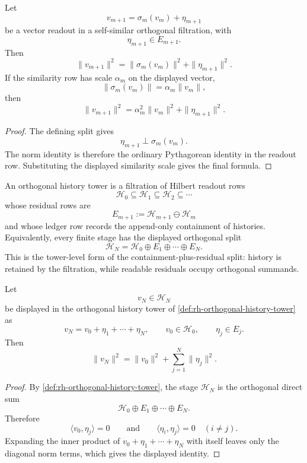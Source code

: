 \begin{theorem}
\label{thm:rh-pythagorean-innovation-law}
Let
$$
v_{m+1}
=
\sigma_m(v_m)+\eta_{m+1}
$$
be a vector readout in a self-similar orthogonal filtration, with
$$
\eta_{m+1}\in E_{m+1}.
$$
Then
$$
\|v_{m+1}\|^2
=
\|\sigma_m(v_m)\|^2+\|\eta_{m+1}\|^2.
$$
If the similarity row has scale $\alpha_m$ on the displayed vector,
$$
\|\sigma_m(v_m)\|=\alpha_m\|v_m\|,
$$
then
$$
\|v_{m+1}\|^2
=
\alpha_m^2\|v_m\|^2+\|\eta_{m+1}\|^2.
$$
\end{theorem}

\begin{proof}
The defining split gives
$$
\eta_{m+1}\perp\sigma_m(v_m).
$$
The norm identity is therefore the ordinary Pythagorean identity in the
readout row. Substituting the displayed similarity scale gives the final
formula.
\end{proof}

\begin{definition}
\label{def:rh-orthogonal-history-tower}
An orthogonal history tower is a filtration of Hilbert readout rows
$$
\mathcal H_0\subseteq\mathcal H_1\subseteq
\mathcal H_2\subseteq\cdots
$$
whose residual rows are
$$
E_{m+1}
:=
\mathcal H_{m+1}\ominus\mathcal H_m
$$
and whose ledger row records the append-only containment of histories.
Equivalently, every finite stage has the displayed orthogonal split
$$
\mathcal H_N
=
\mathcal H_0\oplus E_1\oplus\cdots\oplus E_N.
$$
This is the tower-level form of the containment-plus-residual split:
history is retained by the filtration, while readable residuals occupy
orthogonal summands.
\end{definition}

\begin{theorem}
\label{thm:rh-orthogonal-history-tower-pythagorean-formula}
Let
$$
v_N\in\mathcal H_N
$$
be displayed in the orthogonal history tower of
\autoref{def:rh-orthogonal-history-tower} as
$$
v_N
=
v_0+\eta_1+\cdots+\eta_N,
\qquad
v_0\in\mathcal H_0,
\qquad
\eta_j\in E_j.
$$
Then
$$
\|v_N\|^2
=
\|v_0\|^2+\sum_{j=1}^{N}\|\eta_j\|^2.
$$
\end{theorem}

\begin{proof}
By \autoref{def:rh-orthogonal-history-tower}, the stage $\mathcal H_N$
is the orthogonal direct sum
$$
\mathcal H_0\oplus E_1\oplus\cdots\oplus E_N.
$$
Therefore
$$
\langle v_0,\eta_j\rangle=0
\qquad
\text{and}
\qquad
\langle\eta_i,\eta_j\rangle=0
\quad (i\ne j).
$$
Expanding the inner product of
$v_0+\eta_1+\cdots+\eta_N$ with itself leaves only the diagonal norm
terms, which gives the displayed identity.
\end{proof}

